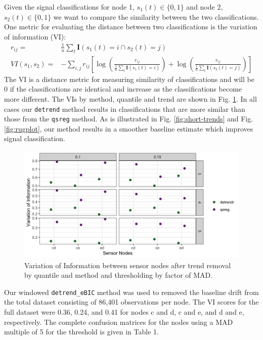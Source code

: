 \documentclass[12pt]{article}
\begin{document}
	Given the signal classifications for node 1, $s_1(t) \in \{0,1\}$ and node 2, $s_2(t)\in\{0,1\}$ we want to compare the similarity between the two classifications. One metric for evaluating the distance between two classifications is the variation of information (VI): 
	\begin{align*}
		r_{ij} =& \frac{1}{n}\sum_t \mathbf{I}(s_1(t) = i  \cap s_2(t) = j)\\
		VI(s_1, s_2) =& -\sum_{i,j} r_{ij} \left[ \log \left(\frac{r_{ij}}{\frac{1}{n}\sum_t \mathbf{I}(s_1(t) = i)}\right) + 
		\log \left(\frac{r_{ij}}{\frac{1}{n}\sum_t \mathbf{I}(s_2(t) = j)}\right) \right]
	\end{align*}	
	The VI is a distance metric for measuring similarity of classifications and will be 0 if the classifications are identical and increase as the classifications become more different. The VIs by method, quantile and trend are shown in Fig. \ref{fig:vi}. In all cases our \texttt{detrend} method results in classifications that are more similar than those from the \texttt{qsreg} method. As is illustrated in Fig. \ref{fig:short-trends} and Fig. \ref{fig:rugplot}, our method results in a smoother baseline estimate which improves signal classification. 
		
	\begin{figure}
		\centering
		\includegraphics[width = .9\linewidth]{Figures/VI_app_short.png}
		\caption{Variation of Information between sensor nodes after trend removal by quantile and method and thresholding by factor of MAD.}
		\label{fig:vi}
	\end{figure}
	
	Our windowed \texttt{detrend\_eBIC} method was used to removed the baseline drift from the total dataset consisting of 86,401 observations per node. The VI scores for the full dataset were 0.36, 0.24, and 0.41 for nodes c and d, c and e, and d and e, respectively. The complete confusion matrices for the nodes using a MAD multiple of 5 for the threshold is given in Table 1. 
		
\end{document}
